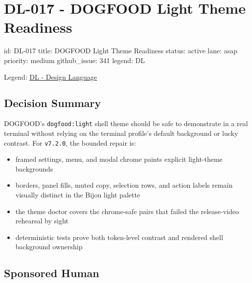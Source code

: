 \chapter{DL-017 - DOGFOOD Light Theme Readiness}\label{record-182}

\smallskip

\begin{RecordMeta}
id: DL-017
title: DOGFOOD Light Theme Readiness
status: active
lane: asap
priority: medium
github_issue: 341
legend: DL

\end{RecordMeta}

Legend: \href{https://github.com/flyingrobots/bijou/blob/1853ad902f6bf219326409e7f743a5a1d6517dbc/docs/legends/DL-design-language.md}{DL - Design Language}

\section{Decision Summary}\label{record-182-decision-summary}

DOGFOOD's \texttt{d\allowbreak{}o\allowbreak{}g\allowbreak{}f\allowbreak{}o\allowbreak{}o\allowbreak{}d\allowbreak{}:\allowbreak{}l\allowbreak{}i\allowbreak{}g\allowbreak{}h\allowbreak{}t} shell theme should be safe to demonstrate in a real terminal without relying on the terminal profile's default background or lucky contrast. For \texttt{v\allowbreak{}7\allowbreak{}.\allowbreak{}2\allowbreak{}.\allowbreak{}0}, the bounded repair is:

\begin{itemize}
\tightlist
\item
  framed settings, menu, and modal chrome paints explicit light-theme backgrounds
\item
  borders, panel fills, muted copy, selection rows, and action labels remain visually distinct in the Bijou light palette
\item
  the theme doctor covers the chrome-safe pairs that failed the release-video rehearsal by sight
\item
  deterministic tests prove both token-level contrast and rendered shell background ownership
\end{itemize}

\section{Sponsored Human}\label{record-182-sponsored-human}


